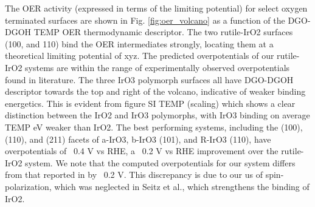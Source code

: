 The OER activity (expressed in terms of the limiting potential) for select oxygen terminated surfaces are shown in Fig. \ref{fig:oer_volcano} as a function of the DGO-DGOH TEMP OER thermodynamic descriptor.
%
The two rutile-IrO2 surfaces (100, and 110) bind the OER intermediates strongly, locating them at a theoretical limiting potential of xyz.
%
The predicted overpotentials of our rutile-IrO2 systems are within the range of experimentally observed overpotentials found in literature.
%
The three IrO3 polymorph surfaces all have DGO-DGOH descriptor towards the top and right of the volcano, indicative of weaker binding energetics.
%
This is evident from figure SI TEMP (scaling) which shows a clear distinction between the IrO2 and IrO3 polymorphs, with IrO3 binding on average TEMP eV weaker than IrO2.
%
The best performing systems, including the (100), (110), and (211) facets of a-IrO3, b-IrO3 (101), and R-IrO3 (110), have overpotentials of ~0.4 V vs RHE,
a ~0.2 V vs RHE improvement over the rutile-IrO2 system.
%
We note that the computed  overpotentials for our \rIrOtwo system differs from that reported in \cite{Seitz2016} by ~0.2 V. This discrepancy is due to our us of spin-polarization, which was neglected in Seitz et al., which strengthens the binding of IrO2.

